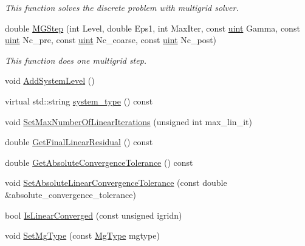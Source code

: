 \begin{DoxyCompactItemize}
\begin{DoxyCompactList}\small\item\em This function solves the discrete problem with multigrid solver. \end{DoxyCompactList}\item 
double \mbox{\hyperlink{classfemus_1_1_linear_implicit_system_a7b835a4f2bd6340c0e76124b017db52a}{M\+G\+Step}} (int Level, double Eps1, int Max\+Iter, const \mbox{\hyperlink{_typedefs_8hpp_a91ad9478d81a7aaf2593e8d9c3d06a14}{uint}} Gamma, const \mbox{\hyperlink{_typedefs_8hpp_a91ad9478d81a7aaf2593e8d9c3d06a14}{uint}} Nc\+\_\+pre, const \mbox{\hyperlink{_typedefs_8hpp_a91ad9478d81a7aaf2593e8d9c3d06a14}{uint}} Nc\+\_\+coarse, const \mbox{\hyperlink{_typedefs_8hpp_a91ad9478d81a7aaf2593e8d9c3d06a14}{uint}} Nc\+\_\+post)
\begin{DoxyCompactList}\small\item\em This function does one multigrid step. \end{DoxyCompactList}\item 
void \mbox{\hyperlink{classfemus_1_1_linear_implicit_system_adc4ea66f698385f9a1a793358899ee48}{Add\+System\+Level}} ()
\item 
virtual std\+::string \mbox{\hyperlink{classfemus_1_1_linear_implicit_system_a45df3966aab87bd06da49c78897a6648}{system\+\_\+type}} () const
\item 
void \mbox{\hyperlink{classfemus_1_1_linear_implicit_system_aac52d38a95ff85409abd6e2d92a7c73a}{Set\+Max\+Number\+Of\+Linear\+Iterations}} (unsigned int max\+\_\+lin\+\_\+it)
\item 
double \mbox{\hyperlink{classfemus_1_1_linear_implicit_system_ac3b43c222222930b8b4a928f95823b5b}{Get\+Final\+Linear\+Residual}} () const
\item 
double \mbox{\hyperlink{classfemus_1_1_linear_implicit_system_a018651018c7725c55096f482d5fa38ba}{Get\+Absolute\+Convergence\+Tolerance}} () const
\item 
void \mbox{\hyperlink{classfemus_1_1_linear_implicit_system_a4c8a469ba9b68aa14c0780f3a7b61d58}{Set\+Absolute\+Linear\+Convergence\+Tolerance}} (const double \&absolute\+\_\+convergence\+\_\+tolerance)
\item 
bool \mbox{\hyperlink{classfemus_1_1_linear_implicit_system_a134831cc5db720540ecafc6382cb7b7d}{Is\+Linear\+Converged}} (const unsigned igridn)
\item 
void \mbox{\hyperlink{classfemus_1_1_linear_implicit_system_a3e3ca74a8990338254d7907397402bac}{Set\+Mg\+Type}} (const \mbox{\hyperlink{_mg_type_enum_8hpp_a35aafc39068a269f658aac64338aa781}{Mg\+Type}} mgtype)

\end{DoxyCompactItemize}
